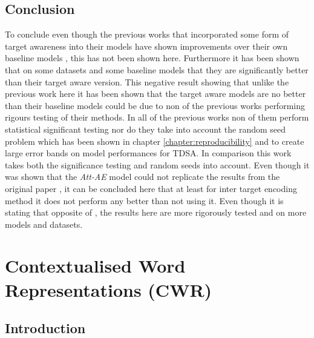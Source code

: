 \subsection{Conclusion}
To conclude even though the previous works that incorporated some form of target awareness into their models have shown improvements over their own baseline models \citep{zhao2019modeling, fan-etal-2018-multi}, this has not been shown here. Furthermore it has been shown that on some datasets and some baseline models that they are significantly better than their target aware version. This negative result showing that unlike the previous work here it has been shown that the target aware models are no better than their baseline models could be due to non of the previous works performing rigours testing of their methods. In all of the previous works non of them perform statistical significant testing nor do they take into account the random seed problem \citep{repro_reimers_2017} which has been shown in chapter \ref{chapter:reproducibility} and \citet{moss-etal-2019-fiesta} to create large error bands on model performances for TDSA. In comparison this work takes both the significance testing and random seeds into account. Even though it was shown that the \textit{Att-AE} model could not replicate the results from the original paper \citep{hazarika-etal-2018-modeling}, it can be concluded here that at least for \citet{hazarika-etal-2018-modeling} inter target encoding method it does not perform any better than not using it. Even though it is stating that opposite of  \citet{hazarika-etal-2018-modeling}, the results here are more rigorously tested and on more models and datasets.

\section{Contextualised Word Representations (CWR)}
\subsection{Introduction}

